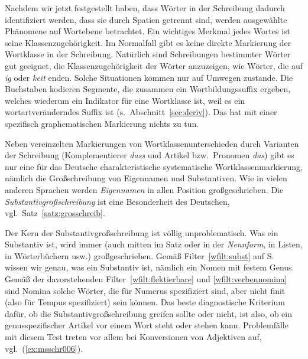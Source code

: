 \label{sec:wortklassschreib}

Nachdem wir jetzt festgestellt haben, dass Wörter in der Schreibung dadurch identifiziert werden, dass sie durch Spatien getrennt sind, werden ausgewählte Phänomene auf Wortebene betrachtet.
Ein wichtiges Merkmal jedes Wortes ist seine Klassenzugehörigkeit.
Im Normalfall gibt es keine direkte Markierung der Wortklasse in der Schreibung.
Natürlich sind Schreibungen bestimmter Wörter gut geeignet, die Klassenzugehörigkeit der Wörter anzuzeigen, wie \zB Wörter, die auf \textit{ig} oder \textit{keit} enden.
Solche Situationen kommen nur auf Umwegen zustande.
Die Buchstaben kodieren Segmente, die zusammen ein Wortbildungssuffix ergeben, welches wiederum ein Indikator für eine Wortklasse ist, weil es ein wortartveränderndes Suffix ist (s.\ Abschnitt~\ref{sec:deriv}).
Das hat mit einer spezifisch graphematischen Markierung nichts zu tun.

Neben vereinzelten Markierungen von Wortklassenunterschieden durch Varianten der Schreibung (Komplementierer \textit{dass} und Artikel bzw.\ Pronomen \textit{das}) gibt es nur eine für das Deutsche charakteristische systematische Wortklassenmarkierung, nämlich die Großschreibung von Eigennamen und Substantiven.
Wie in vielen anderen Sprachen werden \textit{Eigennamen} in allen Position großgeschrieben.
Die \textit{Substantivgroßschreibung} ist eine Besonderheit des Deutschen, vgl.\ Satz~\ref{satz:grosschreib}.


Der Kern der Substantivgroßschreibung ist völlig unproblematisch.
Was ein Substantiv ist, wird immer (auch mitten im Satz oder in der \textit{Nennform}, in Listen, in Wörterbüchern usw.) großgeschrieben.
Gemäß Filter~\ref{wfilt:subst} auf S.~\pageref{wfilt:subst} wissen wir genau, was ein Substantiv ist, nämlich ein Nomen mit festem Genus.
Gemäß der davorstehenden Filter~\ref{wfilt:flektierbare} und \ref{wfilt:verbennomina} sind Nomina solche Wörter, die für Numerus spezifiziert sind, aber nicht finit (also für Tempus spezifiziert) sein können.
Das beste diagnostische Kriterium dafür, ob die Substantivgroßschreibung greifen sollte oder nicht, ist also, ob ein genusspezifischer Artikel vor einem Wort steht oder stehen kann.
Problemfälle mit diesem Test treten vor allem bei Konversionen von Adjektiven auf, vgl.\ (\ref{ex:msschr006}).

